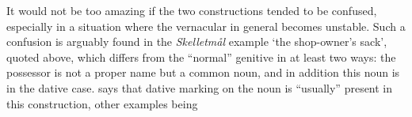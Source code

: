 {%

It would not be too amazing if the two constructions tended to be confused, especially in a situation where the vernacular in general becomes unstable. Such a confusion is arguably found in the \textit{Skelletmål} example ‘the shop-owner’s sack’, quoted above, which differs from the “normal” genitive in at least two ways: the possessor is not a proper name but a common noun, and in addition this noun is in the dative case. \citet[23]{Marklund1976} says that dative marking on the noun is “usually” present in this construction, other examples being 


\ea\label{}

\z 
\z

}
